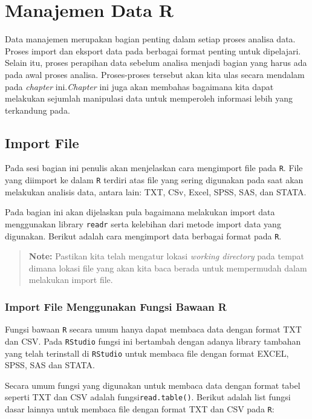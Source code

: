 \documentclass[]{book}
\begin{document}
\chapter{Manajemen Data R}\label{manajemen-data-r}

Data manajemen merupakan bagian penting dalam setiap proses analisa
data. Proses import dan eksport data pada berbagai format penting untuk
dipelajari. Selain itu, proses perapihan data sebelum analisa menjadi
bagian yang harus ada pada awal proses analisa. Proses-proses tersebut
akan kita ulas secara mendalam pada \emph{chapter} ini.\emph{Chapter}
ini juga akan membahas bagaimana kita dapat melakukan sejumlah
manipulasi data untuk memperoleh informasi lebih yang terkandung pada.

\section{Import File}\label{import-file}

Pada sesi bagian ini penulis akan menjelaskan cara mengimport file pada
\texttt{R}. File yang diimport ke dalam \texttt{R} terdiri atas file
yang sering digunakan pada saat akan melakukan analisis data, antara
lain: TXT, CSv, Excel, SPSS, SAS, dan STATA.

Pada bagian ini akan dijelaskan pula bagaimana melakukan import data
menggunakan library \texttt{readr} serta kelebihan dari metode import
data yang digunakan. Berikut adalah cara mengimport data berbagai format
pada \texttt{R}.

\begin{quote}
\textbf{Note: } Pastikan kita telah mengatur lokasi \emph{working
directory} pada tempat dimana lokasi file yang akan kita baca berada
untuk mempermudah dalam melakukan import file.
\end{quote}

\subsection{Import File Menggunakan Fungsi Bawaan
R}\label{import-file-menggunakan-fungsi-bawaan-r}

Fungsi bawaan \texttt{R} secara umum hanya dapat membaca data dengan
format TXT dan CSV. Pada \texttt{RStudio} fungsi ini bertambah dengan
adanya library tambahan yang telah terinstall di \texttt{RStudio} untuk
membaca file dengan format EXCEL, SPSS, SAS dan STATA.

Secara umum fungsi yang digunakan untuk membaca data dengan format tabel
seperti TXT dan CSV adalah fungsi\texttt{read.table()}. Berikut adalah
list fungsi dasar lainnya untuk membaca file dengan format TXT dan CSV
pada \texttt{R}:
\end{document}
